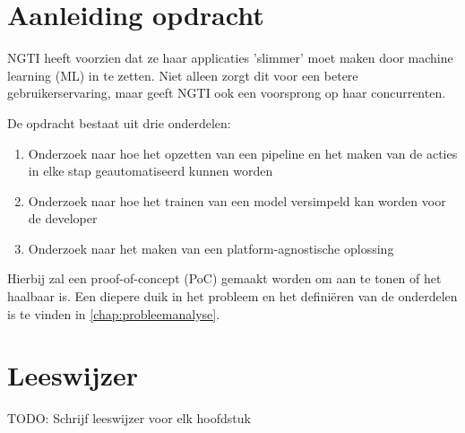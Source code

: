 \section{Aanleiding opdracht}\label{sec:aanleiding-opdracht}
NGTI heeft voorzien dat ze haar applicaties 'slimmer' moet maken door machine learning (ML) in te zetten. Niet alleen zorgt dit voor een betere gebruikerservaring, maar geeft NGTI ook een voorsprong op haar concurrenten.

De opdracht bestaat uit drie onderdelen:
\begin{enumerate}
  \item Onderzoek naar hoe het opzetten van een pipeline en het maken van de acties in elke stap geautomatiseerd kunnen worden
  \item Onderzoek naar hoe het trainen van een model versimpeld kan worden voor de developer
  \item Onderzoek naar het maken van een platform-agnostische oplossing
\end{enumerate}

Hierbij zal een proof-of-concept (PoC) gemaakt worden om aan te tonen of het haalbaar is. Een diepere duik in het probleem en het definiëren van de onderdelen is te vinden in \autoref{chap:probleemanalyse}.

\section{Leeswijzer}\label{sec:leeswijzer}
TODO: Schrijf leeswijzer voor elk hoofdstuk
